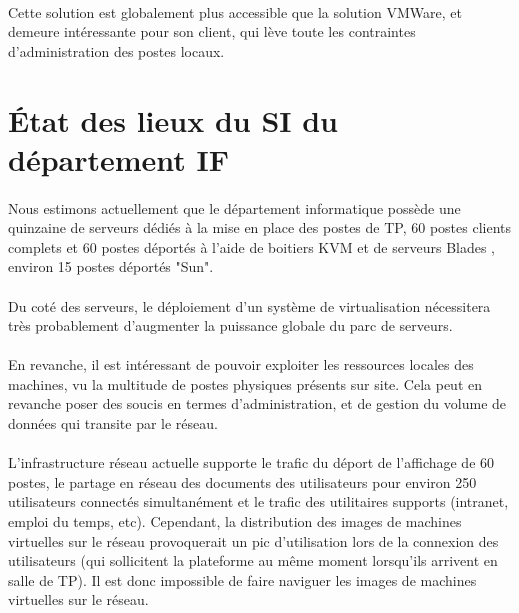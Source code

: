 \paragraph{} Cette solution est globalement plus accessible que la solution
VMWare, et demeure intéressante pour son client, qui lève toute les contraintes
d'administration des postes locaux. 

\section{État des lieux du SI du département IF}

\paragraph{} Nous estimons actuellement que le département informatique possède
une quinzaine de serveurs dédiés à la mise en place des postes de TP, 60 postes
clients complets et 60 postes déportés à l'aide de boitiers KVM et de serveurs
Blades , environ 15 postes déportés "Sun".

\paragraph{} Du coté des serveurs, le déploiement d'un système de virtualisation
nécessitera très probablement d'augmenter la puissance globale du parc de
serveurs.

\paragraph{} En revanche, il est intéressant de pouvoir exploiter les ressources
locales des machines, vu la multitude de postes physiques présents sur site.
Cela peut en revanche poser des soucis en termes d'administration, et de gestion
du volume de données qui transite par le réseau.

\paragraph{} L'infrastructure réseau actuelle supporte le trafic du déport de
l'affichage de 60 postes, le partage en réseau des documents des utilisateurs
pour environ 250 utilisateurs connectés simultanément et le trafic des
utilitaires supports (intranet, emploi du temps, etc). Cependant, la
distribution des images de machines virtuelles sur le réseau provoquerait un pic
d'utilisation lors de la connexion des utilisateurs (qui sollicitent la
plateforme au même moment lorsqu'ils arrivent en salle de TP). Il est donc
impossible de faire naviguer les images de machines virtuelles sur le réseau.
